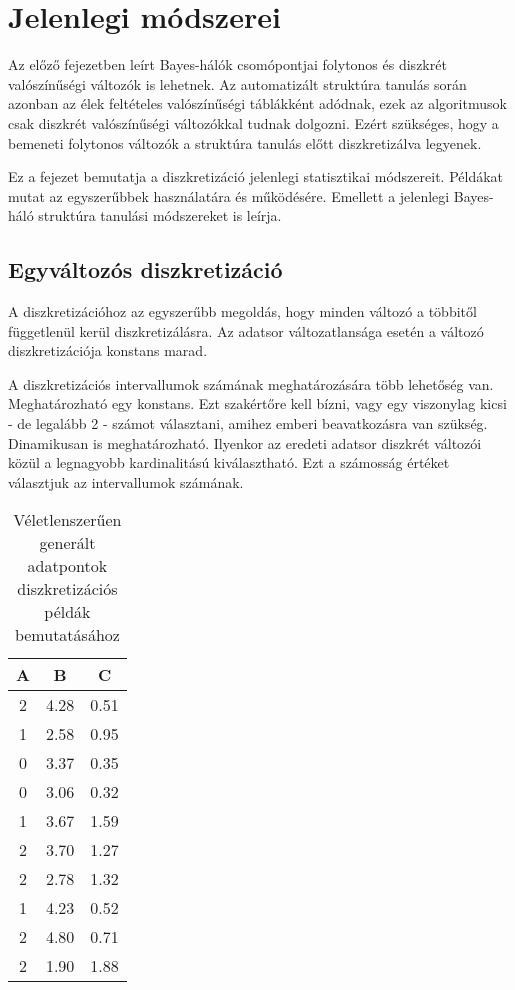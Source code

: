 \chapter{Jelenlegi módszerei}

Az előző fejezetben leírt Bayes-hálók csomópontjai folytonos és diszkrét valószínűségi változók is lehetnek. Az automatizált struktúra tanulás során azonban az élek feltételes valószínűségi táblákként adódnak, ezek az algoritmusok csak diszkrét valószínűségi változókkal tudnak dolgozni. Ezért szükséges, hogy a bemeneti folytonos változók a struktúra tanulás előtt diszkretizálva legyenek.

Ez a fejezet bemutatja a diszkretizáció jelenlegi statisztikai módszereit. Példákat mutat az egyszerűbbek használatára és működésére. Emellett a jelenlegi Bayes-háló struktúra tanulási módszereket is leírja.

\section{Egyváltozós diszkretizáció}
A diszkretizációhoz az egyszerűbb megoldás, hogy minden változó a többitől függetlenül kerül diszkretizálásra. Az adatsor változatlansága esetén a változó diszkretizációja konstans marad.

A diszkretizációs intervallumok számának meghatározására több lehetőség van. Meghatározható egy konstans. Ezt szakértőre kell bízni, vagy egy viszonylag kicsi - de legalább 2 - számot választani, amihez emberi beavatkozásra van szükség. Dinamikusan is meghatározható. Ilyenkor az eredeti adatsor diszkrét változói közül a legnagyobb kardinalitású kiválasztható. Ezt a számosság értéket választjuk az intervallumok számának.

\begin{table}[h]\centering
    \begin{tabular}{ccc}
    A & B    & C    \\ \hline
    2 & 4.28 & 0.51 \\
    1 & 2.58 & 0.95 \\
    0 & 3.37 & 0.35 \\
    0 & 3.06 & 0.32 \\
    1 & 3.67 & 1.59 \\
    2 & 3.70 & 1.27 \\
    2 & 2.78 & 1.32 \\
    1 & 4.23 & 0.52 \\
    2 & 4.80 & 0.71 \\
    2 & 1.90 & 1.88
    \end{tabular}
    \caption{Véletlenszerűen generált adatpontok diszkretizációs példák bemutatásához}
    \label{tab:diszkretizacio-pelda}
\end{table}


